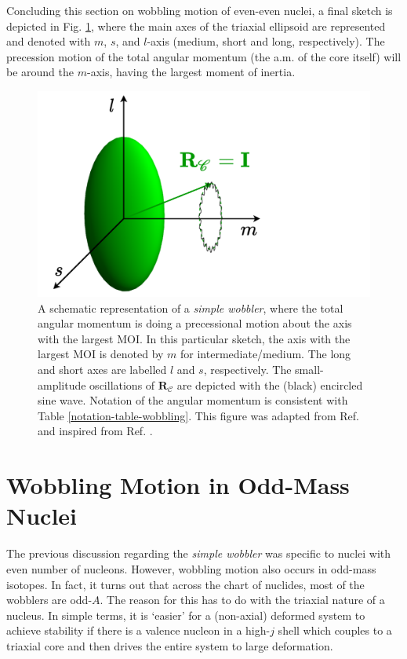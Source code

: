 Concluding this section on wobbling motion of even-even nuclei, a final sketch is depicted in Fig. \ref{simple-wobbler-geometrical-schematic}, where the main axes of the triaxial ellipsoid are represented and denoted with $m$, $s$, and $l$-axis (medium, short and long, respectively). The precession motion of the total angular momentum (the a.m. of the core itself) will be around the $m$-axis, having the largest moment of inertia.
\begin{figure}
    \centering
    \includegraphics[scale=0.6]{Chapters/Figures/simple_wobbler-schematic.pdf}
    \caption{A schematic representation of a \emph{simple wobbler}, where the total angular momentum is doing a precessional motion about the axis with the largest MOI. In this particular sketch, the axis with the largest MOI is denoted by $m$ for intermediate/medium. The long and short axes are labelled $l$ and $s$, respectively. The small-amplitude oscillations of $\mathbf{R}_\mathscr{C}$ are depicted with the (black) encircled sine wave. Notation of the angular momentum is consistent with Table \ref{notation-table-wobbling}. This figure was adapted from Ref. \cite{poenaru2021extensive1} and inspired from Ref. \cite{sensharma2020longitudinal}.}
    \label{simple-wobbler-geometrical-schematic}
\end{figure}

\section{Wobbling Motion in Odd-Mass Nuclei}
\label{chapter-5-odd-wobbling-theory}

The previous discussion regarding the \emph{simple wobbler} was specific to nuclei with even number of nucleons. However, wobbling motion also occurs in odd-mass isotopes. In fact, it turns out that across the chart of nuclides, most of the wobblers are odd-$A$. The reason for this has to do with the triaxial nature of a nucleus. In simple terms, it is `easier' for a (non-axial) deformed system to achieve stability if there is a valence nucleon in a high-$j$ shell which couples to a triaxial core and then drives the entire system to large deformation.

